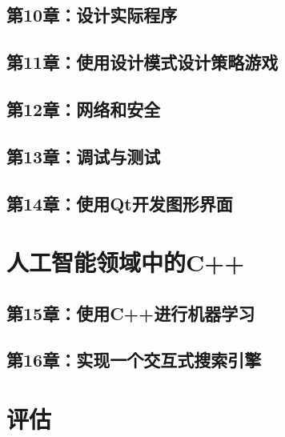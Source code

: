 \documentclass[11pt,a4paper,UTF8]{ctexart}
\begin{document}
		\subsection{第10章：设计实际程序}
		
		\subsection{第11章：使用设计模式设计策略游戏}
		
		\subsection{第12章：网络和安全}
		
		\subsection{第13章：调试与测试}
		
		\subsection{第14章：使用Qt开发图形界面}
		
	\section{人工智能领域中的C++}
	
		\subsection{第15章：使用C++进行机器学习}
		
		\subsection{第16章：实现一个交互式搜索引擎}
		
	\section{评估}
	
	
	
	
	
	
	
	
	
	
	
	
	
	
	
	
\end{document}

